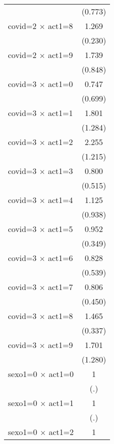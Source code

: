 {\begin{tabular}{l*{1}{c}}
                    &     (0.773)         \\
[1em]
covid=2 $\times$ act1=8&       1.269         \\
                    &     (0.230)         \\
[1em]
covid=2 $\times$ act1=9&       1.739         \\
                    &     (0.848)         \\
[1em]
covid=3 $\times$ act1=0&       0.747         \\
                    &     (0.699)         \\
[1em]
covid=3 $\times$ act1=1&       1.801         \\
                    &     (1.284)         \\
[1em]
covid=3 $\times$ act1=2&       2.255         \\
                    &     (1.215)         \\
[1em]
covid=3 $\times$ act1=3&       0.800         \\
                    &     (0.515)         \\
[1em]
covid=3 $\times$ act1=4&       1.125         \\
                    &     (0.938)         \\
[1em]
covid=3 $\times$ act1=5&       0.952         \\
                    &     (0.349)         \\
[1em]
covid=3 $\times$ act1=6&       0.828         \\
                    &     (0.539)         \\
[1em]
covid=3 $\times$ act1=7&       0.806         \\
                    &     (0.450)         \\
[1em]
covid=3 $\times$ act1=8&       1.465         \\
                    &     (0.337)         \\
[1em]
covid=3 $\times$ act1=9&       1.701         \\
                    &     (1.280)         \\
[1em]
sexo1=0 $\times$ act1=0&           1         \\
                    &         (.)         \\
[1em]
sexo1=0 $\times$ act1=1&           1         \\
                    &         (.)         \\
[1em]
sexo1=0 $\times$ act1=2&           1         \\

\end{tabular}}
